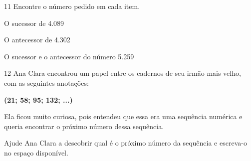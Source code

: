 \pagebreak

\num{11} Encontre o número pedido em cada item.

\begin{escolha}
\item O sucessor de 4.089 \reduline{4.090\hfill}

\item O antecessor de 4.302 \reduline{4.301\hfill}

\item O sucessor e o antecessor do número 5.259 
\end{escolha}


\num{12} Ana Clara encontrou um papel entre os cadernos de seu irmão mais velho, com as seguintes anotações:

\begin{myquote}
\centering
\textbf{(21; 58; 95; 132; ...)}
\end{myquote}

Ela ficou muito curiosa, pois entendeu que essa era uma sequência
numérica e queria encontrar o próximo número dessa sequência.

Ajude Ana Clara a descobrir qual é o próximo número da sequência e escreva-o no espaço disponível.

